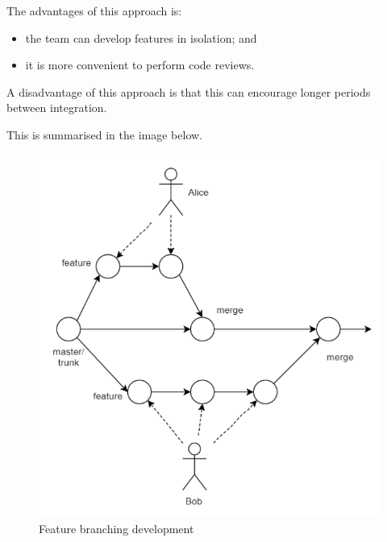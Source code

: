 \documentclass[a4paper, openany]{memoir}
\begin{document}
\begin{itemize}
    The advantages of this approach is:
    \begin{itemize}
        \item the team can develop features in isolation; and
        \item it is more convenient to perform code reviews.
    \end{itemize}
    A disadvantage of this approach is that this can encourage longer periods between integration.

    This is summarised in the image below.
    \begin{figure}[H]
        \centering
        \includegraphics[scale=0.6]{src/3.10 Feature branching.PNG}
        \caption{Feature branching development}
    \end{figure}
    


\end{itemize}
\end{document}
